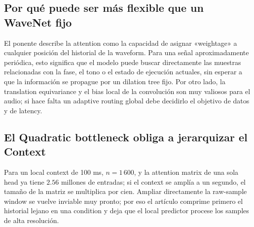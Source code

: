 \subsection{Por qué puede ser más flexible que un WaveNet fijo}

El ponente describe la attention como la capacidad de asignar «weightage» a cualquier posición del historial de la waveform. Para una señal aproximadamente periódica, esto significa que el modelo puede buscar directamente las muestras relacionadas con la fase, el tono o el estado de ejecución actuales, sin esperar a que la información se propague por un dilation tree fijo. Por otro lado, la translation equivariance y el bias local de la convolución son muy valiosos para el audio; si hace falta un adaptive routing global debe decidirlo el objetivo de datos y de latency.



\subsection{El Quadratic bottleneck obliga a jerarquizar el Context}

Para un local context de 100 ms, $n=1\,600$, y la attention matrix de una sola head ya tiene $2.56$ millones de entradas; si el context se amplía a un segundo, el tamaño de la matriz se multiplica por cien. Ampliar directamente la raw-sample window se vuelve inviable muy pronto; por eso el artículo comprime primero el historial lejano en una condition y deja que el local predictor procese los samples de alta resolución.



